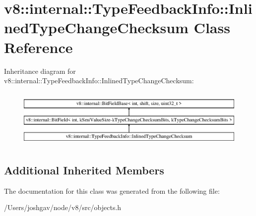 \hypertarget{classv8_1_1internal_1_1_type_feedback_info_1_1_inlined_type_change_checksum}{}\section{v8\+:\+:internal\+:\+:Type\+Feedback\+Info\+:\+:Inlined\+Type\+Change\+Checksum Class Reference}
\label{classv8_1_1internal_1_1_type_feedback_info_1_1_inlined_type_change_checksum}
Inheritance diagram for v8\+:\+:internal\+:\+:Type\+Feedback\+Info\+:\+:Inlined\+Type\+Change\+Checksum\+:\begin{figure}[H]
\begin{center}
\leavevmode
\includegraphics[height=2.862010cm]{classv8_1_1internal_1_1_type_feedback_info_1_1_inlined_type_change_checksum}
\end{center}
\end{figure}
\subsection*{Additional Inherited Members}


The documentation for this class was generated from the following file\+:\begin{DoxyCompactItemize}
\item 
/\+Users/joshgav/node/v8/src/objects.\+h\end{DoxyCompactItemize}
